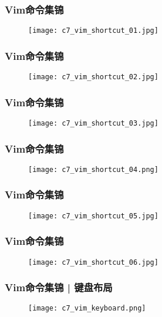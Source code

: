\begin{frame}
  \frametitle{Vim命令集锦}
  \begin{figure}
    \centering
    \texttt{[image: c7\_vim\_shortcut\_01.jpg]}
  \end{figure}
\end{frame}

\begin{frame}
  \frametitle{Vim命令集锦}
  \begin{figure}
    \centering
    \texttt{[image: c7\_vim\_shortcut\_02.jpg]}
  \end{figure}
\end{frame}

\begin{frame}
  \frametitle{Vim命令集锦}
  \begin{figure}
    \centering
    \texttt{[image: c7\_vim\_shortcut\_03.jpg]}
  \end{figure}
\end{frame}

\begin{frame}
  \frametitle{Vim命令集锦}
  \begin{figure}
    \centering
    \texttt{[image: c7\_vim\_shortcut\_04.png]}
  \end{figure}
\end{frame}

\begin{frame}
  \frametitle{Vim命令集锦}
  \begin{figure}
    \centering
    \texttt{[image: c7\_vim\_shortcut\_05.jpg]}
  \end{figure}
\end{frame}

\begin{frame}
  \frametitle{Vim命令集锦}
  \begin{figure}
    \centering
    \texttt{[image: c7\_vim\_shortcut\_06.jpg]}
  \end{figure}
\end{frame}

\begin{frame}
  \frametitle{Vim命令集锦 | 键盘布局}
  \begin{figure}
    \centering
    \texttt{[image: c7\_vim\_keyboard.png]}
  \end{figure}
\end{frame}

